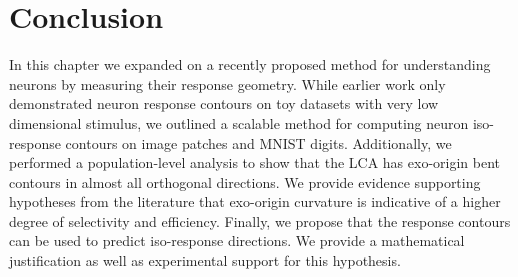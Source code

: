 \section{Conclusion}
In this chapter we expanded on a recently proposed method for understanding neurons by measuring their response geometry. While earlier work only demonstrated neuron response contours on toy datasets with very low dimensional stimulus, we outlined a scalable method for computing neuron iso-response contours on image patches and MNIST digits. Additionally, we performed a population-level analysis to show that the LCA has exo-origin bent contours in almost all orthogonal directions. We provide evidence supporting hypotheses from the literature that exo-origin curvature is indicative of a higher degree of selectivity and efficiency. Finally, we propose that the response contours can be used to predict iso-response directions. We provide a mathematical justification as well as experimental support for this hypothesis.